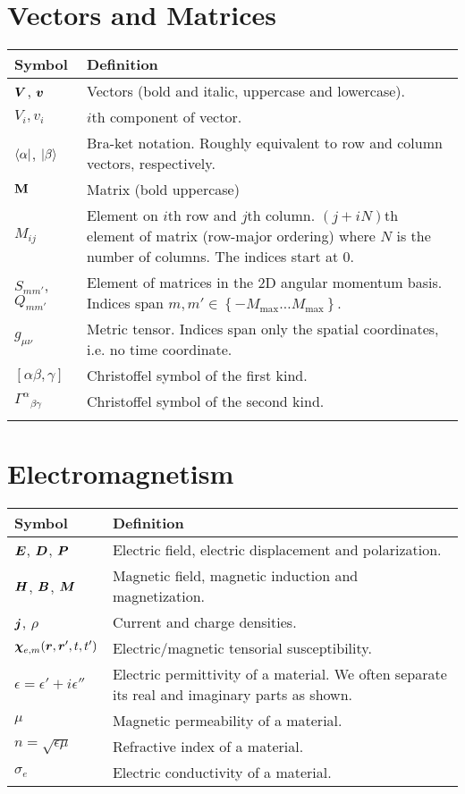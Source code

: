 \section*{Vectors and Matrices}
\begin{tabularx}{\textwidth}{lX}
  \hline\hline
  Symbol		& Definition	\\
  \hline\hline				
  $\boldsymbol{V}$, $\boldsymbol{v}$	& Vectors (bold and italic, uppercase and lowercase).	\\
  $V_i, v_i$		& $i$th component of vector.	\\
  $\Bra{\alpha}$, $\Ket{\beta}$ & Bra-ket notation. Roughly equivalent to row and column vectors, respectively.	\\ 
  $\mathbf{M}$		& Matrix (bold uppercase)	\\
  $M_{ij}$		& Element on $i$th row and $j$th column. $(j+iN)$th element of matrix (row-major ordering) 
			  where $N$ is the number of columns. The indices start at 0.\\
  $S_{mm'}$, $Q_{mm'}$	& Element of matrices in the 2D angular momentum basis. Indices span $m,m'\in\left\{-M_\text{max}\ldots M_\text{max}\right\}$.	\\
  $g_{\mu\nu}$		& Metric tensor. Indices span only the spatial coordinates, i.e. no time coordinate. \\
  $[\alpha\beta,\gamma]$& Christoffel symbol of the first kind.	\\
  ${\Gamma^{\alpha}}_{\beta\gamma}$
			& Christoffel symbol of the second kind. \\
  \hline\hline				\\
\end{tabularx}

\section*{Electromagnetism}
\begin{tabularx}{\textwidth}{lX}
 \hline\hline
 Symbol					& Definition 	\\
 \hline\hline
 $\boldsymbol{E}$, $\boldsymbol{D}$, $\boldsymbol{P}$		& Electric field, electric displacement and polarization.	\\
 $\boldsymbol{H}$, $\boldsymbol{B}$, $\boldsymbol{M}$		& Magnetic field, magnetic induction and magnetization.	\\
 $\boldsymbol{j}$, $\rho$			& Current and charge densities.	\\
 $\boldsymbol{\chi}_{e,m}(\boldsymbol{r},\boldsymbol{r}',t,t')$	& Electric/magnetic tensorial susceptibility. 	\\
 $\epsilon=\epsilon'+i\epsilon''$	& Electric permittivity of a material. We often separate its real and imaginary parts as shown.	\\
 $\mu$					& Magnetic permeability of a material. \\
 $n=\sqrt{\epsilon\mu}$			& Refractive index of a material. 	\\
 $\sigma_e$				& Electric conductivity of a material. \\
 
 \hline\hline
\end{tabularx}


